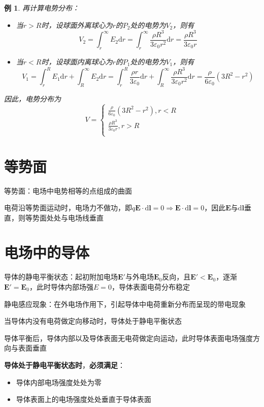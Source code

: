 \documentclass[12pt, a4paper, twoside]{ctexbook}
\newtheorem{example}[theorem]{例}
\begin{document}
\begin{example}
    {\sonti 再计算电势分布}：
    \begin{itemize}
        \item 当$r>R$时，设球面外离球心为$r$的$P_2$处的电势为$V_2$，则有
        $$
        V_2=\int_{r}^{\infty}E_2\mathrm{d}r=\int_{r}^{\infty}\frac{\rho R^3}{3\varepsilon_0r^2}\mathrm{d}r=\frac{\rho R^3}{3\varepsilon_0r}
        $$
        \item 当$r<R$时，设球面内离球心为$r$的$P_1$处的电势为$V_1$，则有
        $$
        V_1=\int_{r}^{R}E_1\mathrm{d}r+\int_{R}^{\infty}E_2\mathrm{d}r=\int_{r}^{R}\frac{\rho r}{3\varepsilon_0}\mathrm{d}r+\int_{R}^{\infty}\frac{\rho R^3}{3\varepsilon_0r^2}\mathrm{d}r=\frac{\rho}{6\varepsilon_0}\left(3R^2-r^2\right)
        $$
    \end{itemize}
    
    因此，电势分布为
    $$
    V=\left\{ \begin{array}{l}
        \frac{\rho}{6\varepsilon_0}\left(3R^2-r^2\right),r<R\\
        \frac{\rho R^3}{3\varepsilon_0r},r>R\\
    \end{array} \right. 
    $$
\end{example}
\section{等势面}
{\sonti 等势面}：电场中电势相等的点组成的曲面

电荷沿等势面运动时，电场力不做功，即$q\boldsymbol{E}\cdot\mathrm{d}\boldsymbol{l}=0 \Rightarrow \boldsymbol{E}\cdot\mathrm{d}\boldsymbol{l}=0$，因此$\boldsymbol{E}$与$\mathrm{d}\boldsymbol{l}$垂直，则等势面处处与电场线垂直
\section{电场中的导体}
{\sonti 导体的静电平衡状态}：起初附加电场$\boldsymbol{E'}$与外电场$\boldsymbol{E}_0$反向，且$\boldsymbol{E'}<\boldsymbol{E}_0$，逐渐$\boldsymbol{E'}=\boldsymbol{E}_0$，此时导体内部场强$E=0$，导体表面电荷分布稳定

{\sonti 静电感应现象}：在外电场作用下，引起导体中电荷重新分布而呈现的带电现象

当导体内没有电荷做定向移动时，导体处于静电平衡状态

导体平衡后，导体内部以及导体表面无电荷做定向运动，此时导体表面电场强度方向与表面垂直

\textbf{导体处于静电平衡状态时}，\textbf{必须满足}：
\begin{itemize}
    \item 导体内部电场强度处处为零
    \item 导体表面上的电场强度处处垂直于导体表面
\end{itemize}
\end{document}
